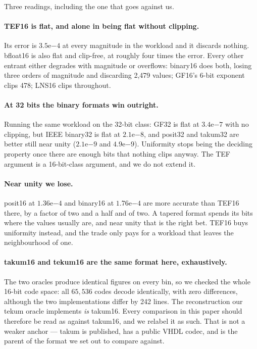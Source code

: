 \documentclass[11pt]{article}
\theoremstyle{definition}
\begin{document}
Three readings, including the one that goes against us.

\paragraph{TEF16 is flat, and alone in being flat without clipping.} Its error
is $3.5\mathrm{e}{-4}$ at every magnitude in the workload and it discards
nothing. bfloat16 is also flat and clip-free, at roughly four times the error.
Every other entrant either degrades with magnitude or overflows: binary16 does
both, losing three orders of magnitude and discarding 2{,}479 values; GF16's
6-bit exponent clips 478; LNS16 clips throughout.

\paragraph{At 32 bits the binary formats win outright.} Running the same
workload on the 32-bit class: GF32 is flat at $3.4\mathrm{e}{-7}$ with no
clipping, but IEEE binary32 is flat at $2.1\mathrm{e}{-8}$, and posit32 and
takum32 are better still near unity ($2.1\mathrm{e}{-9}$ and
$4.9\mathrm{e}{-9}$). Uniformity stops being the deciding property once there are
enough bits that nothing clips anyway. The TEF argument is a 16-bit-class
argument, and we do not extend it.

\paragraph{Near unity we lose.} posit16 at $1.36\mathrm{e}{-4}$ and binary16 at
$1.76\mathrm{e}{-4}$ are more accurate than TEF16 there, by a factor of two and
a half and of two. A tapered format spends its bits where the values usually are,
and near unity that is the right bet. TEF16 buys uniformity instead, and the
trade only pays for a workload that leaves the neighbourhood of one.

\paragraph{takum16 and tekum16 are the same format here, exhaustively.} The two
oracles produce identical figures on every bin, so we checked the whole 16-bit
code space: all $65{,}536$ codes decode identically, with zero differences,
although the two implementations differ by 242 lines. The reconstruction our
tekum oracle implements \emph{is} takum16. Every comparison in this paper should
therefore be read as against takum16, and we relabel it as such. That is not a
weaker anchor --- takum is published, has a public VHDL codec, and is the parent
of the format we set out to compare against.
\end{document}
